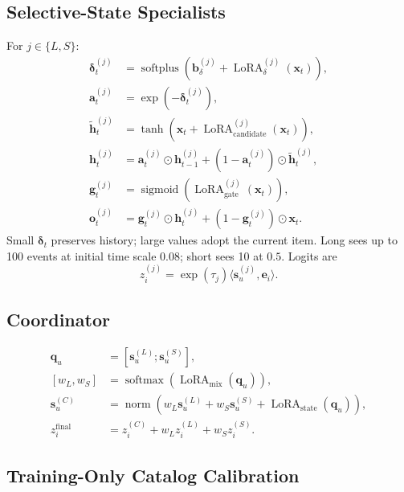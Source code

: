 \documentclass[11pt,a4paper]{article}
\newcommand{\softmax}{\operatorname{softmax}}
\newcommand{\sigmoid}{\operatorname{sigmoid}}
\begin{document}
\subsection{Selective-State Specialists}

For $j\in\{L,S\}$:
\begin{align}
  \bm\delta_t^{(j)}
  &=
  \operatorname{softplus}
  \left(\bm b_\delta^{(j)}+\operatorname{LoRA}^{(j)}_\delta(\bm x_t)\right),\\
  \bm a_t^{(j)}&=\exp(-\bm\delta_t^{(j)}),\\
  \widetilde{\bm h}_t^{(j)}
  &=
  \tanh\left(\bm x_t+\operatorname{LoRA}^{(j)}_{\mathrm{candidate}}(\bm x_t)\right),\\
  \bm h_t^{(j)}
  &=
  \bm a_t^{(j)}\odot\bm h_{t-1}^{(j)}
  +(1-\bm a_t^{(j)})\odot\widetilde{\bm h}_t^{(j)},\\
  \bm g_t^{(j)}
  &=
  \sigmoid\left(\operatorname{LoRA}^{(j)}_{\mathrm{gate}}(\bm x_t)\right),\\
  \bm o_t^{(j)}
  &=
  \bm g_t^{(j)}\odot\bm h_t^{(j)}
  +(1-\bm g_t^{(j)})\odot\bm x_t.
\end{align}
Small $\bm\delta_t$ preserves history; large values adopt the current item. Long sees up to 100 events at initial time scale $0.08$; short sees 10 at $0.5$. Logits are
\begin{equation}
  z_i^{(j)}=\exp(\tau_j)\langle\bm s_u^{(j)},\bm e_i\rangle.
\end{equation}

\subsection{Coordinator}

\begin{align}
  \bm q_u&=[\bm s_u^{(L)};\bm s_u^{(S)}],\\
  [w_L,w_S]&=\softmax(\operatorname{LoRA}_{\mathrm{mix}}(\bm q_u)),\\
  \bm s_u^{(C)}
  &=
  \operatorname{norm}\left(
  w_L\bm s_u^{(L)}+w_S\bm s_u^{(S)}
  +\operatorname{LoRA}_{\mathrm{state}}(\bm q_u)\right),\\
  z_i^{\mathrm{final}}&=z_i^{(C)}+w_Lz_i^{(L)}+w_Sz_i^{(S)}.
\end{align}

\subsection{Training-Only Catalog Calibration}
\end{document}
